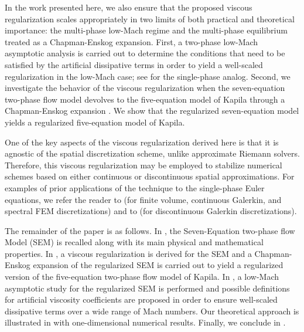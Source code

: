In the work presented here, we also ensure that the proposed viscous regularization scales appropriately in two limits of both practical
and theoretical importance: the multi-phase low-Mach regime and the multi-phase  equilibrium treated as a Chapman-Enskog expansion.
First, a two-phase low-Mach asymptotic analysis is carried out to determine the conditions that need to be satisfied by the artificial dissipative 
terms in order to yield a well-scaled regularization in the low-Mach case; see \cite{Marco_paper_low_mach} for the single-phase analog. 
Second, we investigate the behavior of the viscous regularization when the seven-equation two-phase flow model devolves to the five-equation 
model of Kapila \cite{Kapila_2001} through a Chapman-Enskog expansion \cite{dellacherie,GuillardMurrone2003}. We show 
that the regularized seven-equation model yields a regularized five-equation model of Kapila.

One of the key aspects of the viscous regularization derived here is that it is agnostic of the spatial discretization scheme, unlike approximate 
Riemann solvers. Therefore, this viscous regularization may be employed to stabilize numerical schemes based on either continuous or discontinuous 
spatial approximations. For examples of prior applications of the technique to the single-phase Euler equations, we refer the reader to 
\cite{jlg_VR_SIAM_2004,Marco_paper_low_mach} (for finite volume, continuous Galerkin, and spectral FEM discretizations) and to \cite{valentin} 
(for discontinuous Galerkin discretizations). 

The remainder of the paper is as follows. In , the Seven-Equation two-phase flow Model (SEM) is recalled along with its main 
physical and mathematical properties. In , a viscous regularization is derived for the SEM and a Chapman-Enskog expansion of the 
regularized SEM is carried out to yield a regularized version of the five-equation two-phase flow model of Kapila. In , a low-Mach 
asymptotic study for the regularized SEM is performed and possible definitions for artificial viscosity coefficients are proposed in order to ensure 
well-scaled dissipative terms over a wide range of Mach numbers. Our theoretical approach is illustrated in  with one-dimensional 
numerical results. Finally, we conclude in .
%
